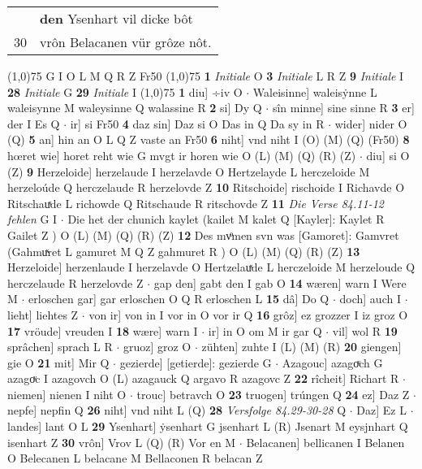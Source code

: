 \documentclass[8pt,a4paper,notitlepage]{article}
\begin{document}
\begin{table}[ht]
\begin{minipage}[t]{0.5\linewidth}
\begin{tabular}{rl}
 & \textbf{den} Ysenhart vil dicke bôt\\ 
30 & vrôn Belacanen vür grôze nôt.\\ 
\end{tabular}
\scriptsize
\line(1,0){75} \newline
G I O L M Q R Z Fr50 \newline
\line(1,0){75} \newline
\textbf{1} \textit{Initiale} O  \textbf{3} \textit{Initiale} L R Z  \textbf{9} \textit{Initiale} I  \textbf{28} \textit{Initiale} G  \textbf{29} \textit{Initiale} I  \newline
\line(1,0){75} \newline
\textbf{1} diu] ÷iv O  $\cdot$ Waleisinne] waleisẏnne L waleisynne M waleysinne Q walassine R \textbf{2} si] Dy Q  $\cdot$ sîn minne] sine sinne R \textbf{3} er] der I Es Q  $\cdot$ ir] si Fr50 \textbf{4} daz sin] Daz si O Das in Q Da sy in R  $\cdot$ wider] nider O (Q) \textbf{5} an] hin an O L Q Z vaste an Fr50 \textbf{6} niht] vnd niht I (O) (M) (Q) (Fr50) \textbf{8} hœret wie] horet reht wie G mvgt ir horen wie O (L) (M) (Q) (R) (Z)  $\cdot$ diu] si O (Z) \textbf{9} Herzeloide] herzelaude I herzelavde O Hertzelayde L herczeloide M herzeloúde Q herczelaude R herzelovde Z \textbf{10} Ritschoide] rischoide I Richavde O Ritschauͯde L richowde Q Ritschaude R ritschovde Z \textbf{11} \textit{Die Verse 84.11-12 fehlen} G I   $\cdot$ Die het der chunich kaylet (kailet M kalet Q [Kayler]: Kaylet R Gailet Z ) O (L) (M) (Q) (R) (Z) \textbf{12} Des mvͦmen svn was [Gamoret]: Gamvret (Gahmuͯret L gamuret M Q Z gahmuret R ) O (L) (M) (Q) (R) (Z) \textbf{13} Herzeloide] herzenlaude I herzelavde O Hertzelauͯde L herczeloide M herzeloude Q herczelaude R herzelovde Z  $\cdot$ gap den] gabt den I gab O \textbf{14} wæren] warn I Were M  $\cdot$ erloschen gar] gar erloschen O Q R erloschen L \textbf{15} dâ] Do Q  $\cdot$ doch] auch I  $\cdot$ lieht] liehtes Z  $\cdot$ von ir] von in I vor in O vor ir Q \textbf{16} grôz] ez grozzer I iz groz O \textbf{17} vröude] vreuden I \textbf{18} wære] warn I  $\cdot$ ir] in O om M ir gar Q  $\cdot$ vil] wol R \textbf{19} sprâchen] sprach L R  $\cdot$ gruoz] groz O  $\cdot$ zühten] zuhte I (L) (M) (R) \textbf{20} giengen] gie O \textbf{21} mit] Mir Q  $\cdot$ gezierde] [getierde]: gezierde G  $\cdot$ Azagouc] azagoͮch G azagoͮc I azagovch O (L) azagauck Q argavo R azagovc Z \textbf{22} rîcheit] Richart R  $\cdot$ niemen] nienen I niht O  $\cdot$ trouc] betravch O \textbf{23} truogen] trúngen Q \textbf{24} ez] Daz Z  $\cdot$ nepfe] nepfin Q \textbf{26} niht] vnd niht L (Q) \textbf{28} \textit{Versfolge 84.29-30-28} Q   $\cdot$ Daz] Ez L  $\cdot$ landes] lant O L \textbf{29} Ysenhart] ẏsenhart G jsenhart L (R) Jsenart M eysjnhart Q isenhart Z \textbf{30} vrôn] Vrov L (Q) (R) Vor en M  $\cdot$ Belacanen] bellicanen I Belanen O Belecanen L belacane M Bellaconen R belacan Z \newline

\end{minipage}
\end{table}
\end{document}

